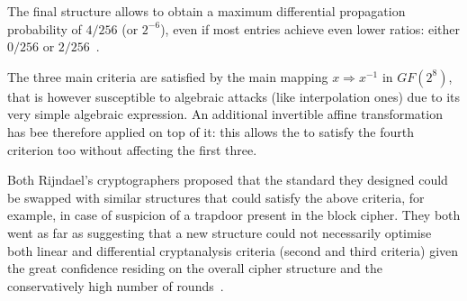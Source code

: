         The final structure allows to obtain a maximum differential propagation probability of $4/256$ (or $2^{-6}$), even if most entries achieve even lower ratios: either $0/256$ or $2/256$~\cite{daemen1999aes}.

        The three main criteria are satisfied by the main mapping $x \Rightarrow x^{-1}$ in $GF(2^8)$, that is however susceptible to algebraic attacks (like interpolation ones) due to its very simple algebraic expression. An additional invertible affine transformation has bee therefore applied on top of it: this allows the \sbocs{} to satisfy the fourth criterion too without affecting the first three.

        Both Rijndael's cryptographers proposed that the standard \sbocs{} they designed could be swapped with similar structures that could satisfy the above criteria, for example, in case of suspicion of a trapdoor present in the block cipher. They both went as far as suggesting that a new \sbocs{} structure could not necessarily optimise both linear and differential cryptanalysis criteria (second and third criteria) given the great confidence residing on the overall cipher structure and the conservatively high number of rounds~\cite{daemen1999aes}.